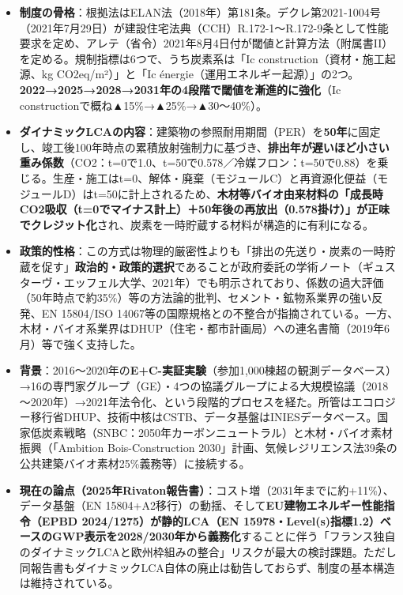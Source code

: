 \begin{itemize}
\tightlist
\item
  \textbf{制度の骨格}：根拠法はELAN法（2018年）第181条。デクレ第2021-1004号（2021年7月29日）が建設住宅法典（CCH）R.172-1～R.172-9条として性能要求を定め、アレテ（省令）2021年8月4日付が閾値と計算方法（附属書II）を定める。規制指標は6つで、うち炭素系は「Ic
  construction（資材・施工起源、kg CO2eq/m²）」と「Ic
  énergie（運用エネルギー起源）」の2つ。\textbf{2022→2025→2028→2031年の4段階で閾値を漸進的に強化}（Ic
  constructionで概ね▲15\%→▲25\%→▲30～40\%）。
\item
  \textbf{ダイナミックLCAの内容}：建築物の参照耐用期間（PER）を\textbf{50年}に固定し、竣工後100年時点の累積放射強制力に基づき、\textbf{排出年が遅いほど小さい重み係数}（CO2：t=0で1.0、t=50で0.578／冷媒フロン：t=50で0.88）を乗じる。生産・施工はt=0、解体・廃棄（モジュールC）と再資源化便益（モジュールD）はt=50に計上されるため、\textbf{木材等バイオ由来材料の「成長時CO2吸収（t=0でマイナス計上）＋50年後の再放出（0.578掛け）」が正味でクレジット化}され、炭素を一時貯蔵する材料が構造的に有利になる。
\item
  \textbf{政策的性格}：この方式は物理的厳密性よりも「排出の先送り・炭素の一時貯蔵を促す」\textbf{政治的・政策的選択}であることが政府委託の学術ノート（ギュスターヴ・エッフェル大学、2021年）でも明示されており、係数の過大評価（50年時点で約35\%）等の方法論的批判、セメント・鉱物系業界の強い反発、EN
  15804/ISO
  14067等の国際規格との不整合が指摘されている。一方、木材・バイオ系業界はDHUP（住宅・都市計画局）への連名書簡（2019年6月）等で強く支持した。
\item
  \textbf{背景}：2016～2020年の\textbf{E+C-実証実験}（参加1,000棟超の観測データベース）→16の専門家グループ（GE）・4つの協議グループによる大規模協議（2018～2020年）→2021年法令化、という段階的プロセスを経た。所管はエコロジー移行省DHUP、技術中核はCSTB、データ基盤はINIESデータベース。国家低炭素戦略（SNBC：2050年カーボンニュートラル）と木材・バイオ素材振興（「Ambition
  Bois-Construction
  2030」計画、気候レジリエンス法39条の公共建築バイオ素材25\%義務等）に接続する。
\item
  \textbf{現在の論点（2025年Rivaton報告書）}：コスト増（2031年までに約+11\%）、データ基盤（EN
  15804+A2移行）の動揺、そして\textbf{EU建物エネルギー性能指令（EPBD
  2024/1275）が静的LCA（EN
  15978・Level(s)指標1.2）ベースのGWP表示を2028/2030年から義務化}することに伴う「フランス独自のダイナミックLCAと欧州枠組みの整合」リスクが最大の検討課題。ただし同報告書もダイナミックLCA自体の廃止は勧告しておらず、制度の基本構造は維持されている。
\end{itemize}

